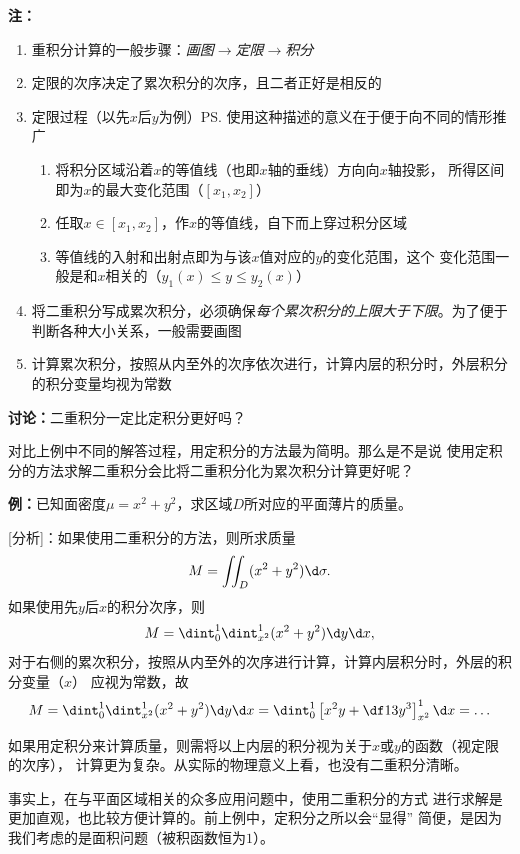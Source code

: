 {\bf 注：}%
\begin{enumerate}[(1)]
  \setlength{\itemindent}{1cm}
  \item 重积分计算的一般步骤：{\it 画图$\to$定限$\to$积分}
  \item 定限的次序决定了累次积分的次序，且二者正好是相反的
  \item 定限过程（以先$x$后$y$为例）\ps{使用这种描述的意义在于便于向不同的情形推广}
  \begin{enumerate}[Step-1:]
    \setlength{\itemindent}{1cm}
    \item 将积分区域沿着$x$的等值线（也即$x$轴的垂线）方向向$x$轴投影，
    所得区间即为$x$的最大变化范围（$[x_1,x_2]$）
    \item 任取$x\in[x_1,x_2]$，作$x$的等值线，自下而上穿过积分区域
    \item 等值线的入射和出射点即为与该$x$值对应的$y$的变化范围，这个
    变化范围一般是和$x$相关的（$y_1(x)\leq y\leq y_2(x)$）
  \end{enumerate}
  \item 将二重积分写成累次积分，必须确保{\it 每个累次积分的上限大于下限}。为了便于
  判断各种大小关系，一般需要画图
  \item 计算累次积分，按照从内至外的次序依次进行，计算内层的积分时，外层积分
  的积分变量均视为常数
\end{enumerate}

\begin{shaded}

{\bf 讨论：}二重积分一定比定积分更好吗？

对比上例中不同的解答过程，用定积分的方法最为简明。那么是不是说
使用定积分的方法求解二重积分会比将二重积分化为累次积分计算更好呢？

{\bf 例：}已知面密度$\mu=x^2+y^2$，求区域$D$所对应的平面薄片的质量。

[分析]：如果使用二重积分的方法，则所求质量
$$M=\iint_D(x^2+y^2)\d\sigma.$$
如果使用先$y$后$x$的积分次序，则
$$M=\dint_0^1\dint_{x^2}^1(x^2+y^2)\d y\d x,$$
对于右侧的累次积分，按照从内至外的次序进行计算，计算内层积分时，外层的积分变量（$x$）
应视为常数，故
$$M=\dint_0^1\dint_{x^2}^1(x^2+y^2)\d y\d x
=\dint_0^1\left[x^2y+\df13y^3\right]_{x^2}^1\d x=\ldots$$

如果用定积分来计算质量，则需将以上内层的积分视为关于$x$或$y$的函数（视定限的次序），
计算更为复杂。从实际的物理意义上看，也没有二重积分清晰。

事实上，在与平面区域相关的众多应用问题中，使用二重积分的方式
进行求解是更加直观，也比较方便计算的。前上例中，定积分之所以会“显得”
简便，是因为我们考虑的是面积问题（被积函数恒为$1$）。

\end{shaded}
% 

